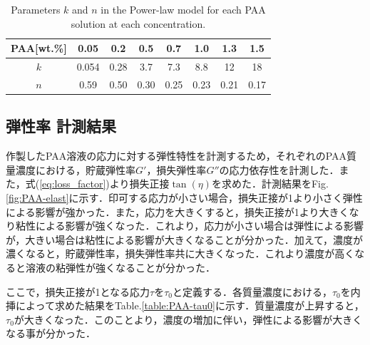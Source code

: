 \begin{table}[h]
	\centering
	\caption{Parameters $k$ and $n$ in the Power-law model for each PAA solution at each concentration.}
	\label{table:power-law}
	\begin{tabular}{c|c|c|c|c|c|c|c} \hline
		PAA[wt.\%] & 0.05  & 0.2  & 0.5  & 0.7  & 1.0  & 1.3  & 1.5  \\ \hline \hline
		$k$        & 0.054 & 0.28 & 3.7  & 7.3  & 8.8  & 12   & 18   \\ \hline
		$n$        & 0.59  & 0.50 & 0.30 & 0.25 & 0.23 & 0.21 & 0.17 \\ \hline
	\end{tabular}
\end{table}

\newpage

\subsection{弾性率 計測結果}
\label{sec:elasticity}

作製したPAA溶液の応力に対する弾性特性を計測するため，それぞれのPAA質量濃度における，貯蔵弾性率$G'$，損失弾性率$G''$の応力依存性を計測した．また，式(\ref{eq:loss_factor})より損失正接$\tan\left(\eta\right)$を求めた．計測結果をFig.\ref{fig:PAA-elast}に示す．印可する応力が小さい場合，損失正接が1より小さく弾性による影響が強かった．また，応力を大きくすると，損失正接が1より大きくなり粘性による影響が強くなった．これより，応力が小さい場合は弾性による影響が，大きい場合は粘性による影響が大きくなることが分かった．加えて，濃度が濃くなると，貯蔵弾性率，損失弾性率共に大きくなった．これより濃度が高くなると溶液の粘弾性が強くなることが分かった．

ここで，損失正接が1となる応力$\tau$を$\tau_0$と定義する．各質量濃度における，$\tau_0$を内挿によって求めた結果をTable.\ref{table:PAA-tau0}に示す．質量濃度が上昇すると，$\tau_0$が大きくなった．このことより，濃度の増加に伴い，弾性による影響が大きくなる事が分かった．

